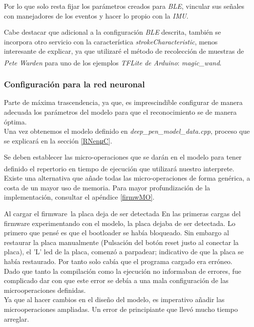 Por lo que solo resta fijar los parámetros creados para \textit{BLE},
vincular sus señales con manejadores de los eventos y hacer lo propio
con la \textit{IMU}.

Cabe destacar que adicional a la configuración \textit{BLE} descrita, también
se incorpora otro servicio con la característica \textit{strokeCharacteristic},
menos interesante de explicar, ya que utilizaré el método de recolección de
muestras de \textit{Pete Warden} para uno de los ejemplos
\textit{TFLite de Arduino}: \textit{magic\_wand}\textsuperscript{\cite{petewardenmw}}.

\subsubsection{Configuración para la red neuronal}
Parte de máxima trascendencia, ya que, es imprescindible configurar de
manera adecuada los parámetros del modelo para que el reconocimiento
se de manera óptima.\\
Una vez obtenemos el modelo definido en \textit{deep\_pen\_model\_data.cpp},
proceso que se explicará en la sección \ref{RNenμC}.

Se deben establecer las micro-operaciones que se darán en el modelo
para tener definido el repertorio en tiempo de ejecución que utilizará
nuestro interprete\textsuperscript{\cite{intro-tensor-micro}}.
Existe una alternativa que añade todas las micro-operaciones de forma genérica,
a costa de un mayor uso de memoria. Para mayor profundización de la
implementación, consultar el apéndice \ref{firmwMO}.

\begin{problemas}{Al cargar el firmware\, la placa deja de ser detectada}
    En las primeras cargas del firmware experimentando con el modelo, la placa
    dejaba de ser detectada. Lo primero que pensé es que el bootloader se había
    bloqueado. Sin embargo al restaurar la placa manualmente ({\small Pulsación
    del botón reset justo al conectar la placa}), el 'L' led de la placa,
    comenzó a parpadear; indicativo de que la placa se había restaurado.
    Por tanto solo cabía que el programa cargado era erróneo.
    Dado que tanto la compilación como la ejecución no informaban de errores,
    fue complicado dar con que este error se debía a una mala configuración
    de las microoperaciones definidas.\\Ya que al hacer cambios en el diseño
    del modelo, es imperativo añadir las microoperaciones ampliadas.
    Un error de principiante que llevó mucho tiempo arreglar.
\end{problemas}

